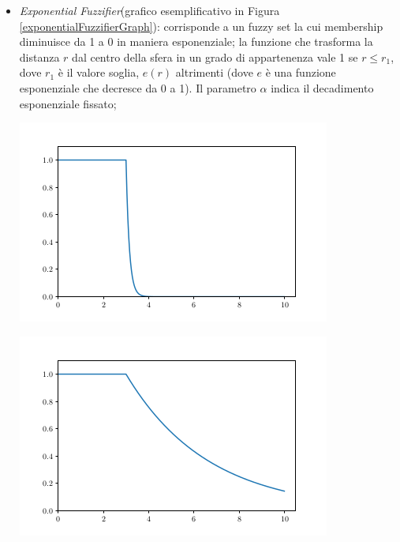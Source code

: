 \documentclass[12pt,a4paper]{report}
\begin{document}
\begin{itemize}
\item \emph{Exponential Fuzzifier}(grafico esemplificativo in Figura \ref{exponentialFuzzifierGraph}): corrisponde a un fuzzy set la cui  membership diminuisce da 1 a 0 in maniera esponenziale; la funzione che trasforma la distanza $r$ dal centro della sfera in un grado di appartenenza vale 1 se $r \leq r_1$, dove $r_1$ è il valore soglia, $e(r)$ altrimenti (dove $e$ è una funzione esponenziale che decresce da 0 a 1). Il parametro $\alpha$ indica il decadimento esponenziale fissato;

\begin{minipage}{\linewidth}
	\centering
       \includegraphics[width=0.8\linewidth]{images/exponentialFuzzifier.png}
	 \label{exponentialFuzzifierGraph}
\end{minipage}

\begin{minipage}{\linewidth}
	\centering
       \includegraphics[width=0.8\linewidth]{images/exponentialFuzzifier2.png}
\end{minipage}


\end{itemize}
\end{document}
